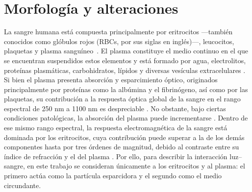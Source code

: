 \section{Morfología y alteraciones}
\label{section:morphology}


La sangre humana está compuesta principalmente por eritrocitos —también conocidos como glóbulos rojos (RBCs, por sus siglas en inglés)—, leucocitos, plaquetas y plasma sanguíneo~\cite{mescherJunqueirasBasicHistology2024}. El plasma constituye el medio continuo en el que se encuentran suspendidos estos elementos y está formado por agua, electrolitos, proteínas plasmáticas, carbohidratos, lípidos y diversas vesículas extracelulares \cite{mescherJunqueirasBasicHistology2024}. Si bien el plasma presenta absorción y esparcimiento óptico, originados principalmente por proteínas como la albúmina y el fibrinógeno, así como por las plaquetas, su contribución a la respuesta óptica global de la sangre en el rango espectral de 250 nm a 1100 nm es despreciable \cite{meinkeOpticalPropertiesPlatelets2007}. No obstante, bajo ciertas condiciones patológicas, la  absorción del plasma puede incrementarse \cite{bosschaartLiteratureReviewNovel2014}. Dentro de ese mismo rango espectral, la respuesta electromagnética de la sangre está dominada por los eritrocitos, cuya contribución puede superar a la de los demás componentes hasta por tres órdenes de magnitud, debido al contraste entre su índice de refracción y el del plasma \cite{bosschaartLiteratureReviewNovel2014}. Por ello, para describir la interacción luz–sangre, en este trabajo se consideran únicamente a los eritrocitos y al plasma: el primero actúa como la partícula esparcidora  y el segundo como el medio circundante.

